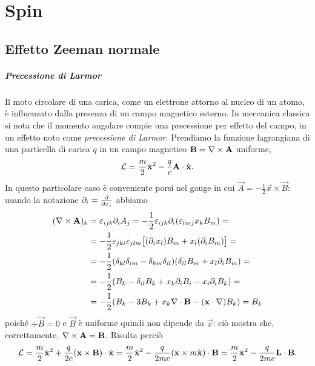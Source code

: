 \chapter{Spin}
\section{Effetto Zeeman normale}
\paragraph{Precessione di Larmor}
Il moto circolare di una carica, come un elettrone attorno al nucleo di un atomo, è influenzato dalla presenza di un campo magnetico esterno.
In meccanica classica si nota che il momento angolare compie una precessione per effetto del campo, in un effetto noto come \emph{precessione di Larmor}.
Prendiamo la funzione lagrangiana di una particella di carica $q$ in un campo magnetico $\mathbf{B}=\nabla\times\mathbf{A}$ uniforme,
\begin{equation}
	\mathcal L=\frac{m}2\dot{\mathbf{x}}^2-\frac{q}{c}{\mathbf{A}}\cdot{\dot{\mathbf{x}}}.
	\label{eq:lagrangiana-campo-magnetico}
\end{equation}
In questo particolare caso è conveniente porsi nel gauge in cui $\vec A=-\frac12\vec x\times\vec B$: usando la notazione $\partial_i=\frac{\partial {}}{\partial {x_i}}$ abbiamo
\begin{equation}
	\begin{split}
		(\nabla\times\mathbf{A})_k&=\varepsilon_{ijk}\partial_iA_j=-\frac12\varepsilon_{ijk}\partial_i(\varepsilon_{lmj}x_kB_m)=\\
		&=-\frac12\varepsilon_{jki}\varepsilon_{jlm}\big[(\partial_ix_l)B_m+x_l(\partial_iB_m)\big]=\\
		&=-\frac12(\delta_{kl}\delta_{im}-\delta_{km}\delta_{il})(\delta_{il}B_m+x_l\partial_iB_m)=\\
		&=-\frac12(B_k-\delta_{il}B_k+x_k\partial_iB_i-x_i\partial_iB_k)=\\
		&=-\frac12(B_k-3B_k+x_k\nabla\cdot\mathbf{B}-({\mathbf{x}}\cdot{\nabla})B_k)=B_k
	\end{split}
\end{equation}
poich\'e $\div\vec B=0$ e $\vec B$ è uniforme quindi non dipende da $\vec x$: ciò mostra che, correttamente, $\nabla\times\mathbf{A}=\mathbf{B}$.
Risulta perciò
\begin{equation}
	\mathcal L=\frac{m}2\dot{\mathbf{x}}^2+\frac{q}{2c}{(\mathbf{x}\times\mathbf{B})}\cdot{\dot{\mathbf{x}}}=
	\frac{m}2\dot{\mathbf{x}}^2-\frac{q}{2mc}{(\mathbf{x}\times m\dot{\mathbf{x}})}\cdot{\mathbf{B}}=
	\frac{m}2\dot{\mathbf{x}}^2-\frac{q}{2mc}{\mathbf{L}}\cdot{\mathbf{B}}.
\end{equation}
